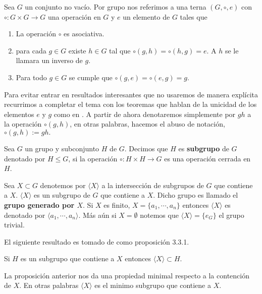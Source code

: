 	\begin{df}
Sea $G$ un conjunto no vacío. Por grupo nos referimos a una terna $(G, \circ, e)$ con $\circ:G \times G \to G$ una operación en $G$ y $e$ un elemento de $G$ tales que

	\begin{enumerate}
		\item La operación $\circ$ es asociativa.
		\item para cada $g \in G$ existe $h \in G$ tal que $ \circ (g,h)= \circ(h ,g)=e$. A $h$ se le llamara un inverso de $g$. 
		\item Para todo $g \in G$ se cumple que $\circ(g ,e) =  \circ(e,g) = g.$
	\end{enumerate}
	\end{df}

	\begin{cn}
Para evitar entrar en resultados interesantes que no usaremos de manera explícita recurrimos a completar el tema con los teoremas que hablan de la unicidad de los elementos $e$ y $g$ como en \cite{alg_grove}. A partir de ahora denotaremos simplemente por $gh$ a la operación $\circ(g,h)$, en otras palabras, hacemos el abuso de notación,  $\circ(g,h):=gh.$
	\end{cn}
	
	\begin{df}
	Sea $G$ un grupo y subconjunto $H$ de $G$. Decimos que $H$ es \textbf{subgrupo} de $G$ denotado por $H \leq G$, si la operación $\circ:H \times H \to G$ es una operación cerrada en $H$.	
		\end{df}
		
\begin{ob}	
Sea $X \subset G$ denotemos por $\langle X \rangle$ a la intersección de subgrupos de $G$ que contiene a $X$. $\langle X \rangle$ es un subgrupo de $G$ que contiene a $X$. Dicho grupo es llamado el \textbf{grupo generado por $X$}. Si $X$ es finito, $X=\{ a_1, \cdots , a_n\}$ entonces $\langle X \rangle$ es denotado por $\langle a_1, \cdots, a_n \rangle$. Más aún si $X=\emptyset$ notemos que $\langle X \rangle=\{e_G\}$ el grupo trivial.
\end{ob}

El siguiente resultado es tomado de \cite{alg_i} como proposición 3.3.1.

\begin{pr}
Si $H$ es un subgrupo que contiene a $X$ entonces $\langle X \rangle \subset H$.
\end{pr}
La proposición anterior nos da una propiedad minimal respecto a la contención de $X$. En otras palabras	$\langle X \rangle$ es el minimo subgrupo que contiene a $X$.


